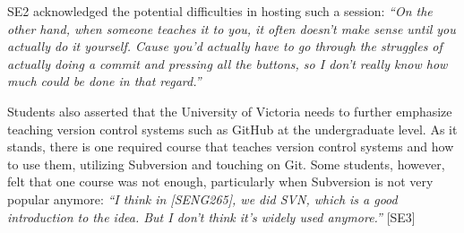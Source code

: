 


SE2 acknowledged the potential difficulties in hosting such a session: \textit{``On the other hand, when someone teaches it to you, it often doesn't make sense until you actually do it yourself. Cause you'd actually have to go through the struggles of actually doing a commit and pressing all the buttons, so I don't really know how much could be done in that regard.''}

Students also asserted that the University of Victoria needs to further emphasize teaching version control systems such as GitHub at the undergraduate level. As it stands, there is one required course that teaches version control systems and how to use them, utilizing Subversion and touching on Git. Some students, however, felt that one course was not enough, particularly when Subversion is not very popular anymore: \textit{``I think in [SENG265], we did SVN, which is a good introduction to the idea. But I don't think it's widely used anymore.''} [SE3]



